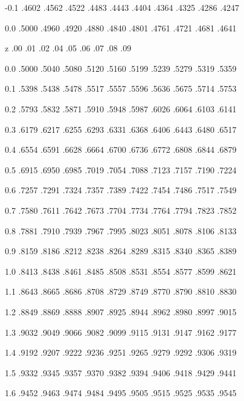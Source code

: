 \documentclass[12pt,fleqn]{article}\usepackage{../../common}
\begin{document}
-0.1 .4602 .4562 .4522 .4483 .4443 .4404 .4364 .4325 .4286 .4247

0.0 .5000 .4960 .4920 .4880 .4840 .4801 .4761 .4721 .4681 .4641

\newpage

z \hspace{1em} .00 \hspace{1em} .01 \hspace{1em} .02 \hspace{1em} .04 \hspace{1em} .05 \hspace{1em} .06 \hspace{1em} .07 \hspace{1em} .08 \hspace{1em} .09

0.0 .5000 .5040 .5080 .5120 .5160 .5199 .5239 .5279 .5319 .5359

0.1 .5398 .5438 .5478 .5517 .5557 .5596 .5636 .5675 .5714 .5753

0.2 .5793 .5832 .5871 .5910 .5948 .5987 .6026 .6064 .6103 .6141

0.3 .6179 .6217 .6255 .6293 .6331 .6368 .6406 .6443 .6480 .6517

0.4 .6554 .6591 .6628 .6664 .6700 .6736 .6772 .6808 .6844 .6879

0.5 .6915 .6950 .6985 .7019 .7054 .7088 .7123 .7157 .7190 .7224

0.6 .7257 .7291 .7324 .7357 .7389 .7422 .7454 .7486 .7517 .7549

0.7 .7580 .7611 .7642 .7673 .7704 .7734 .7764 .7794 .7823 .7852

0.8 .7881 .7910 .7939 .7967 .7995 .8023 .8051 .8078 .8106 .8133

0.9 .8159 .8186 .8212 .8238 .8264 .8289 .8315 .8340 .8365 .8389

1.0 .8413 .8438 .8461 .8485 .8508 .8531 .8554 .8577 .8599 .8621

1.1 .8643 .8665 .8686 .8708 .8729 .8749 .8770 .8790 .8810 .8830

1.2 .8849 .8869 .8888 .8907 .8925 .8944 .8962 .8980 .8997 .9015

1.3 .9032 .9049 .9066 .9082 .9099 .9115 .9131 .9147 .9162 .9177

1.4 .9192 .9207 .9222 .9236 .9251 .9265 .9279 .9292 .9306 .9319

1.5 .9332 .9345 .9357 .9370 .9382 .9394 .9406 .9418 .9429 .9441

1.6 .9452 .9463 .9474 .9484 .9495 .9505 .9515 .9525 .9535 .9545
\end{document}
